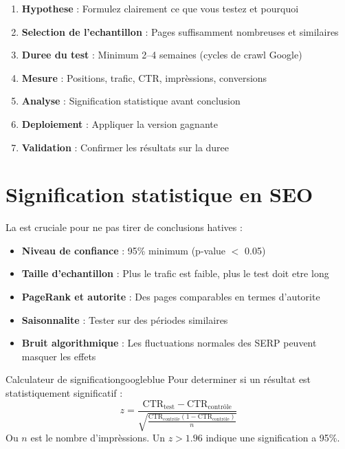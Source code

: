 \begin{enumerate}
    \item \textbf{Hypothese} : Formulez clairement ce que vous testez et pourquoi
    \item \textbf{Selection de l'echantillon} : Pages suffisamment nombreuses et similaires
    \item \textbf{Duree du test} : Minimum 2--4 semaines (cycles de crawl Google)
    \item \textbf{Mesure} : Positions, trafic, CTR, imprèssions, conversions
    \item \textbf{Analyse} : Signification statistique avant conclusion
    \item \textbf{Deploiement} : Appliquer la version gagnante
    \item \textbf{Validation} : Confirmer les résultats sur la duree
\end{enumerate}

\section{Signification statistique en SEO}

La  est cruciale pour ne pas tirer de conclusions hatives :

\begin{itemize}
    \item \textbf{Niveau de confiance} : 95\% minimum (p-value $<$ 0.05)
    \item \textbf{Taille d'echantillon} : Plus le trafic est faible, plus le test doit etre long
    \item \textbf{PageRank et autorite} : Des pages comparables en termes d'autorite
    \item \textbf{Saisonnalite} : Tester sur des périodes similaires
    \item \textbf{Bruit algorithmique} : Les fluctuations normales des SERP peuvent masquer les effets
\end{itemize}

\begin{mybox}{Calculateur de signification}{googleblue}
Pour determiner si un résultat est statistiquement significatif :
\[
z = \frac{\text{CTR}_{\text{test}} - \text{CTR}_{\text{contrôle}}}
{\sqrt{\frac{\text{CTR}_{\text{contrôle}}(1 - \text{CTR}_{\text{contrôle}})}{n}}}
\]
Ou $n$ est le nombre d'imprèssions. Un $z > 1.96$ indique une signification a 95\%.
\end{mybox}

